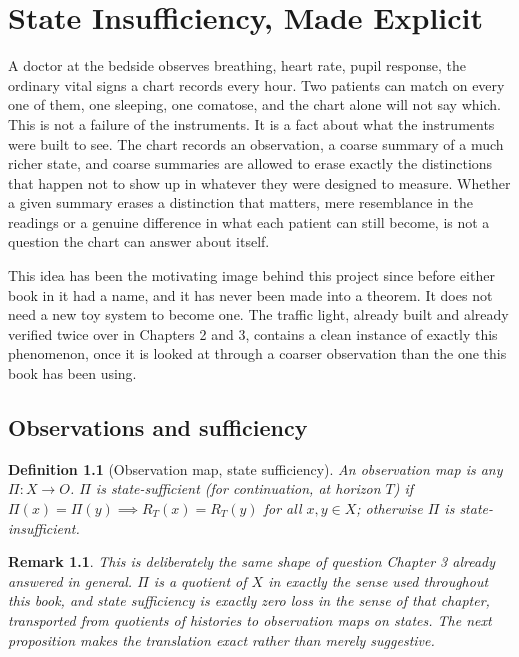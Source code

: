 \documentclass[11pt]{report}
\newtheorem{definition}{Definition}[chapter]
\newtheorem{remark}{Remark}[chapter]
\begin{document}
\chapter{State Insufficiency, Made Explicit}

A doctor at the bedside observes breathing, heart rate, pupil
response, the ordinary vital signs a chart records every hour. Two
patients can match on every one of them, one sleeping, one comatose,
and the chart alone will not say which. This is not a failure of the
instruments. It is a fact about what the instruments were built to
see. The chart records an observation, a coarse summary of a much
richer state, and coarse summaries are allowed to erase exactly the
distinctions that happen not to show up in whatever they were designed
to measure. Whether a given summary erases a distinction that
matters, mere resemblance in the readings or a genuine difference in
what each patient can still become, is not a question the chart can
answer about itself.

This idea has been the motivating image behind this project since
before either book in it had a name, and it has never been made into
a theorem. It does not need a new toy system to become one. The
traffic light, already built and already verified twice over in
Chapters 2 and 3, contains a clean instance of exactly this
phenomenon, once it is looked at through a coarser observation than
the one this book has been using.

\section*{Observations and sufficiency}

\begin{definition}[Observation map, state sufficiency]
An observation map is any $\Pi : X \to O$. $\Pi$ is state-sufficient
(for continuation, at horizon $T$) if $\Pi(x) = \Pi(y) \implies
R_T(x) = R_T(y)$ for all $x,y \in X$; otherwise $\Pi$ is
state-insufficient.
\end{definition}

\begin{remark}
This is deliberately the same shape of question Chapter 3 already
answered in general. $\Pi$ is a quotient of $X$ in exactly the sense
used throughout this book, and state sufficiency is exactly zero loss
in the sense of that chapter, transported from quotients of histories
to observation maps on states. The next proposition makes the
translation exact rather than merely suggestive.
\end{remark}
\end{document}
